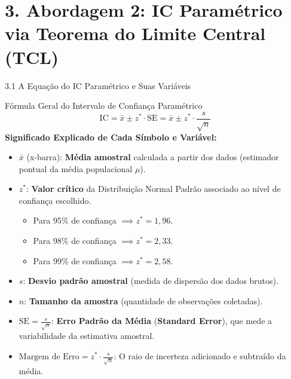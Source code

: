 \documentclass[10pt, aspectratio=169]{beamer}
\begin{document}
\section{3. Abordagem 2: IC Paramétrico via Teorema do Limite Central (TCL)}

\begin{frame}{3.1 A Equação do IC Paramétrico e Suas Variáveis}
    \begin{block}{Fórmula Geral do Intervalo de Confiança Paramétrico}
        \[ \text{IC} = \bar{x} \pm z^* \cdot \text{SE} = \bar{x} \pm z^* \cdot \frac{s}{\sqrt{n}} \]
        \textbf{Significado Explicado de Cada Símbolo e Variável:}
        \begin{itemize}
            \item $\bar{x}$ (x-barra): 	\textbf{Média amostral} calculada a partir dos dados (estimador pontual da média populacional $\mu$).
            \item $z^*$: 	\textbf{Valor crítico} da Distribuição Normal Padrão associado ao nível de confiança escolhido.
                  \begin{itemize}
                      \item Para 95\% de confiança $\implies z^* = 1{,}96$.
                      \item Para 98\% de confiança $\implies z^* = 2{,}33$.
                      \item Para 99\% de confiança $\implies z^* = 2{,}58$.
                  \end{itemize}
            \item $s$: \textbf{Desvio padrão amostral} (medida de dispersão dos dados brutos).
            \item $n$: \textbf{Tamanho da amostra} (quantidade de observações coletadas).
            \item $\text{SE} = \frac{s}{\sqrt{n}}$: \textbf{Erro Padrão da Média} (\textbf{Standard Error}), que mede a variabilidade da estimativa amostral.
            \item $\text{Margem de Erro} = z^* \cdot \frac{s}{\sqrt{n}}$: O raio de incerteza adicionado e subtraído da média.
        \end{itemize}
    \end{block}
\end{frame}
\end{document}
